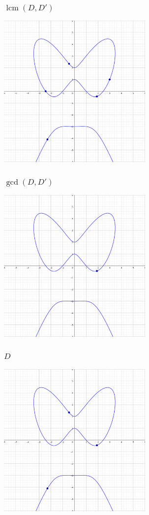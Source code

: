 \documentclass{beamer}
\DeclareMathOperator{\lcm}{lcm}
\begin{document}
\begin{frame}
\frametitle{$\lcm(D, D')$}
  \begin{center} \includegraphics[height=7.6cm]{lcm_d1_d2.png} \end{center}
\end{frame}
\begin{frame}
\frametitle{$\gcd(D, D')$}
  \begin{center} \includegraphics[height=7.6cm]{gcd_d1_d2.png} \end{center}
\end{frame}
\begin{frame}
\frametitle{$D$}
  \begin{center} \includegraphics[height=7.6cm]{d1.png} \end{center}
\end{frame}
\end{document}
